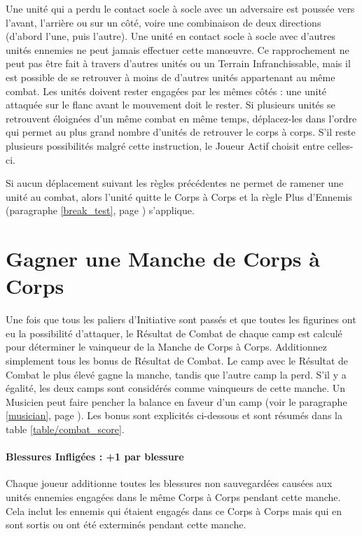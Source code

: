 Une unité qui a perdu le contact socle à socle avec un adversaire est poussée vers l'avant, l'arrière ou sur un côté, voire une combinaison de deux directions (d'abord l'une, puis l'autre). Une unité en contact socle à socle avec d'autres unités ennemies ne peut jamais effectuer cette manœuvre. Ce rapprochement ne peut pas être fait à travers d'autres unités ou un Terrain Infranchissable, mais il est possible de se retrouver à moins de  d'autres unités appartenant au même combat. Les unités doivent rester engagées par les mêmes côtés : une unité attaquée sur le flanc avant le mouvement doit le rester. Si plusieurs unités se retrouvent éloignées d'un même combat en même temps, déplacez-les dans l'ordre qui permet au plus grand nombre d'unités de retrouver le corps à corps. S'il reste plusieurs possibilités malgré cette instruction, le Joueur Actif choisit entre celles-ci.

Si aucun déplacement suivant les règles précédentes ne permet de ramener une unité au combat, alors l'unité quitte le Corps à Corps et la règle Plus d'Ennemis (paragraphe \ref{break_test}, page \pageref{break_test}) s'applique.

\newpage
\section{Gagner une Manche de Corps à Corps}

Une fois que tous les paliers d'Initiative sont passés et que toutes les figurines ont eu la possibilité d'attaquer, le Résultat de Combat de chaque camp est calculé pour déterminer le vainqueur de la Manche de Corps à Corps. Additionnez simplement tous les bonus de Résultat de Combat. Le camp avec le Résultat de Combat le plus élevé gagne la manche, tandis que l'autre camp la perd. S'il y a égalité, les deux camps sont considérés comme vainqueurs de cette manche. Un Musicien peut faire pencher la balance en faveur d'un camp (voir le paragraphe \ref{musician}, page \pageref{musician}). Les bonus sont explicités ci-dessous et sont résumés dans la table \ref{table/combat_score}.

\paragraph{Blessures Infligées : +1 par blessure}

Chaque joueur additionne toutes les blessures non sauvegardées causées aux unités ennemies engagées dans le même Corps à Corps pendant cette manche. Cela inclut les ennemis qui étaient engagés dans ce Corps à Corps mais qui en sont sortis ou ont été exterminés pendant cette manche.

